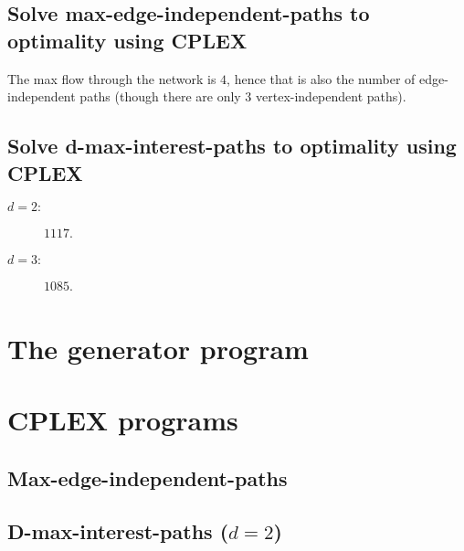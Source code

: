 \documentclass[a4paper, oneside, final]{memoir}
\begin{document}
\section{Solve max-edge-independent-paths to optimality using CPLEX}

The max flow through the network is $4$, hence that is also the number
of edge-independent paths (though there are only $3$
vertex-independent paths).

\section{Solve d-max-interest-paths to optimality using CPLEX}

\begin{description}
\item[$d=2:$] $1117$.
\item[$d=3:$] $1085$.
\end{description}

\appendix

\chapter{The generator program}



\chapter{CPLEX programs}

\section{Max-edge-independent-paths}



\section{D-max-interest-paths ($d=2$)}


\end{document}
